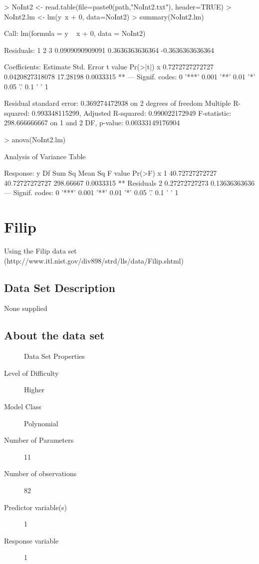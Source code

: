 \documentclass[10pt]{article}
\begin{document}
\begin{Schunk}
\begin{Sinput}
> NoInt2 <- read.table(file=paste0(path,"NoInt2.txt"), header=TRUE)
> NoInt2.lm <- lm(y~x + 0, data=NoInt2)
> summary(NoInt2.lm)
\end{Sinput}
\begin{Soutput}
Call:
lm(formula = y ~ x + 0, data = NoInt2)

Residuals:
               1                2                3 
 0.0909090909091  0.3636363636364 -0.3636363636364 

Coefficients:
         Estimate      Std. Error  t value  Pr(>|t|)   
x 0.7272727272727 0.0420827318078 17.28198 0.0033315 **
---
Signif. codes:  0 '***' 0.001 '**' 0.01 '*' 0.05 '.' 0.1 ' ' 1

Residual standard error: 0.369274472938 on 2 degrees of freedom
Multiple R-squared:  0.993348115299,	Adjusted R-squared:  0.990022172949 
F-statistic: 298.666666667 on 1 and 2 DF,  p-value: 0.00333149176904
\end{Soutput}
\begin{Sinput}
> anova(NoInt2.lm)
\end{Sinput}
\begin{Soutput}
Analysis of Variance Table

Response: y
          Df         Sum Sq        Mean Sq   F value    Pr(>F)   
x          1 40.72727272727 40.72727272727 298.66667 0.0033315 **
Residuals  2  0.27272727273  0.13636363636                       
---
Signif. codes:  0 '***' 0.001 '**' 0.01 '*' 0.05 '.' 0.1 ' ' 1
\end{Soutput}
\end{Schunk}


\section{Filip}
Using the Filip data set (http://www.itl.nist.gov/div898/strd/lls/data/Filip.shtml)

\subsection*{Data Set Description}
None supplied


\subsection*{About the data set}

\begin{description}
   \item[]Data Set Properties
   \item[Level of Difficulty] Higher
   \item[Model Class] Polynomial
   \item[Number of Parameters] 11
   \item[Number of observations]82
   \item[Predictor variable(s)]1
   \item[Response variable]1
\end{description}
\end{document}
